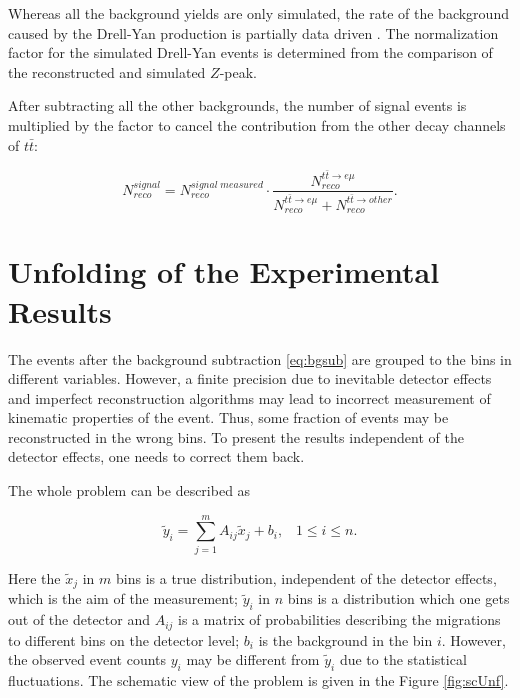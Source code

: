 Whereas all the background yields are only simulated, the rate of the background caused by the Drell-Yan production is 
partially data driven \cite{Chatrchyan:2011nb}. The normalization factor for the simulated Drell-Yan events is determined 
from the comparison of the reconstructed and simulated $Z$-peak. 

After subtracting all the other backgrounds, the number of signal events is multiplied by the factor to cancel the contribution
from the other decay channels of $t\bar{t}$:

\begin{equation}\label{eq:bgsub}
 N^{signal}_{reco} = N^{signal\;measured}_{reco} \cdot \frac{N^{t\bar{t} \rightarrow e\mu}_{reco}}{N^{t\bar{t} \rightarrow e\mu}_{reco} + N^{t\bar{t} \rightarrow other}_{reco}}.
\end{equation}

\section{Unfolding of the Experimental Results}\label{sec:unfold}

The events after the background  subtraction \ref{eq:bgsub} are grouped to the bins in different variables. However, a finite precision
due to inevitable detector effects and imperfect reconstruction algorithms may lead to incorrect measurement of kinematic properties of the event.
Thus, some fraction of events may be reconstructed in the wrong bins. To present the results independent of the detector effects,
one needs to correct them back.

The whole problem can be described as

\begin{equation}\label{eq:UnfoldProb}
 \tilde{y}_i = \sum_{j = 1}^{m} A_{ij}\tilde{x}_{j} + b_{i}, \;\;\; 1 \leq i \leq n.
\end{equation}

Here the $\tilde{x}_j$ in $m$ bins is a true distribution, independent of the detector effects, which is the aim of the measurement;
$\tilde{y}_i$ in $n$ bins is a distribution which one gets out of the detector and $A_{ij}$ is a matrix of probabilities describing 
the migrations to different bins on the detector level; $b_{i}$ is the background in the bin $i$. 
However, the observed event counts $y_{i}$ may be different from $\tilde{y}_{i}$ due to the statistical fluctuations.
The schematic view of the problem is given in the Figure \ref{fig:scUnf}.

